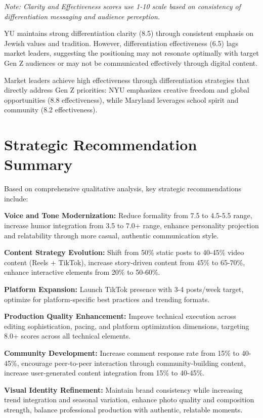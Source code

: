 \documentclass[12pt]{report}
\begin{document}
\textit{Note: Clarity and Effectiveness scores use 1-10 scale based on consistency of differentiation messaging and audience perception.}

YU maintains strong differentiation clarity (8.5) through consistent emphasis on Jewish values and tradition. However, differentiation effectiveness (6.5) lags market leaders, suggesting the positioning may not resonate optimally with target Gen Z audiences or may not be communicated effectively through digital content.

Market leaders achieve high effectiveness through differentiation strategies that directly address Gen Z priorities: NYU emphasizes creative freedom and global opportunities (8.8 effectiveness), while Maryland leverages school spirit and community (8.2 effectiveness).

\section{Strategic Recommendation Summary}

Based on comprehensive qualitative analysis, key strategic recommendations include:

\textbf{Voice and Tone Modernization:} Reduce formality from 7.5 to 4.5-5.5 range, increase humor integration from 3.5 to 7.0+ range, enhance personality projection and relatability through more casual, authentic communication style.

\textbf{Content Strategy Evolution:} Shift from 50\% static posts to 40-45\% video content (Reels + TikTok), increase story-driven content from 45\% to 65-70\%, enhance interactive elements from 20\% to 50-60\%.

\textbf{Platform Expansion:} Launch TikTok presence with 3-4 posts/week target, optimize for platform-specific best practices and trending formats.

\textbf{Production Quality Enhancement:} Improve technical execution across editing sophistication, pacing, and platform optimization dimensions, targeting 8.0+ scores across all technical elements.

\textbf{Community Development:} Increase comment response rate from 15\% to 40-45\%, encourage peer-to-peer interaction through community-building content, increase user-generated content integration from 15\% to 40-45\%.

\textbf{Visual Identity Refinement:} Maintain brand consistency while increasing trend integration and seasonal variation, enhance photo quality and composition strength, balance professional production with authentic, relatable moments.
\end{document}
